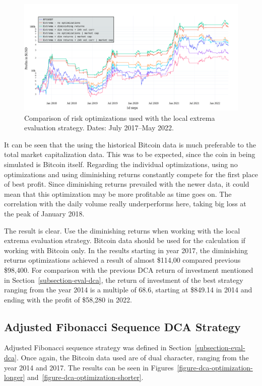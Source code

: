 \begin{figure}[!t]
    \centering
    \includegraphics[width=\columnwidth]{figures/evaluation-optimization-shorter.pdf}
    \caption{Comparison of risk optimizations used with the local extrema evaluation strategy. Dates: July 2017--May 2022.}
    \label{figure-optimization-shorter}
\end{figure}

It can be seen that the using the historical Bitcoin data is much preferable to the total market capitalization data. This was to be expected, since the coin in being simulated is Bitcoin itself. Regarding the individual optimizations, using no optimizations and using diminishing returns constantly compete for the first place of best profit. Since diminishing returns prevailed with the newer data, it could mean that this optimization may be more profitable as time goes on. The correlation with the daily volume really underperforms here, taking big loss at the peak of January 2018.

The result is clear. Use the diminishing returns when working with the local extrema evaluation strategy. Bitcoin data should be used for the calculation if working with Bitcoin only. In the results starting in year 2017, the diminishing returns optimizations achieved a result of almost \$114,00 compared previous \$98,400. For comparison with the previous DCA return of investment mentioned in Section~\ref{subsection-eval-dca}, the return of investment of the best strategy ranging from the year 2014 is a multiple of 68.6, starting at \$849.14 in 2014 and ending with the profit of \$58,280 in 2022.

\subsection*{Adjusted Fibonacci Sequence DCA Strategy}
Adjusted Fibonacci sequence strategy was defined in Section~\ref{subsection-eval-dca}. Once again, the Bitcoin data used are of dual character, ranging from the year 2014 and 2017. The results can be seen in Figures~\ref{figure-dca-optimization-longer} and~\ref{figure-dca-optimization-shorter}.

